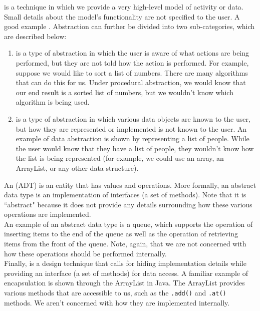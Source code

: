  is a technique in which we provide a very high-level model of activity or data. Small details about the model's functionality are not specified to the user. A good example . Abstraction can further be divided into two sub-categories, which are described below:
\begin{enumerate}
    \item {} is a type of abstraction in which the user is aware of what actions are being performed, but they are not told how the action is performed. For example, suppose we would like to sort a list of numbers. There are many algorithms that can do this for us. Under procedural abstraction, we would know that our end result is a sorted list of numbers, but we wouldn't know which algorithm is being used.
    \item {} is a type of abstraction in which various data objects are known to the user, but how they are represented or implemented is not known to the user. An example of data abstraction is shown by representing a list of people. While the user would know that they have a list of people, they wouldn't know how the list is being represented (for example, we could use an array, an ArrayList, or any other data structure).
\end{enumerate}

An  (ADT) is an entity that has values and operations. More formally, an abstract data type is an implementation of interfaces (a set of methods). 
Note that it is ``abstract" because it does not provide any details surrounding how these various operations are implemented. \\

An example of an abstract data type is a queue, which supports the operation of inserting items to the end of the queue as well as the operation of retrieving items from the front of the queue. Note, again, that we are not concerned with how these operations should be performed internally. \\

Finally,  is a design technique that calls for hiding implementation details while providing an interface (a set of methods) for data access. A familiar example of encapsulation is shown through the ArrayList in Java. The ArrayList provides various methods that are accessible to us, such as the \verb!.add()! and \verb!.at()! methods. We aren't concerned with how they are implemented internally.


